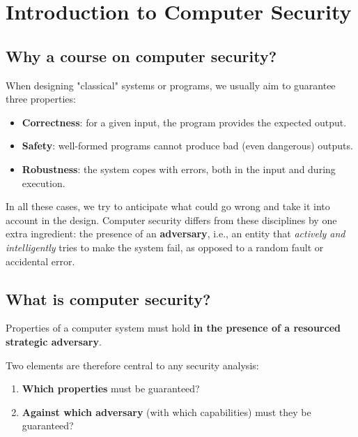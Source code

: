 
\chapter{Introduction to Computer Security}
\label{ch:intro-security}

\section{Why a course on computer security?}

When designing "classical" systems or programs, we usually aim to guarantee three properties:

\begin{itemize}
    \item \textbf{Correctness}: for a given input, the program provides the expected output.
    \item \textbf{Safety}: well-formed programs cannot produce bad (even dangerous) outputs.
    \item \textbf{Robustness}: the system copes with errors, both in the input and during execution.
\end{itemize}

In all these cases, we try to anticipate what could go wrong and take it into account in the design. Computer security differs from these disciplines by one extra ingredient: the presence of an \textbf{adversary}, i.e., an entity that \emph{actively and intelligently} tries to make the system fail, as opposed to a random fault or accidental error.

\section{What is computer security?}

\begin{definition}
Properties of a computer system must hold \textbf{in the presence of a resourced strategic adversary}.
\end{definition}

Two elements are therefore central to any security analysis:
\begin{enumerate}
    \item \textbf{Which properties} must be guaranteed?
    \item \textbf{Against which adversary} (with which capabilities) must they be guaranteed?
\end{enumerate}

